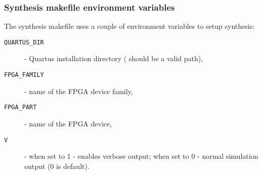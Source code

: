     \subsubsection{Synthesis makefile environment variables}
    \label{sec:syn_make_var}
    
    The synthesis makefile uses a couple of environment variables to setup synthesis:
    \begin{description}
    \item[\texttt{QUARTUS\_DIR}] - Quartus installation directory ( should be a valid path),
    \item[\texttt{FPGA\_FAMILY}] - name of the FPGA device family,
    \item[\texttt{FPGA\_PART}] - name of the FPGA device,
    \item[\texttt{V}] - when set to 1 - enables verbose output; when set to 0 - normal simulation output (0 is default).
    \end{description}
    
